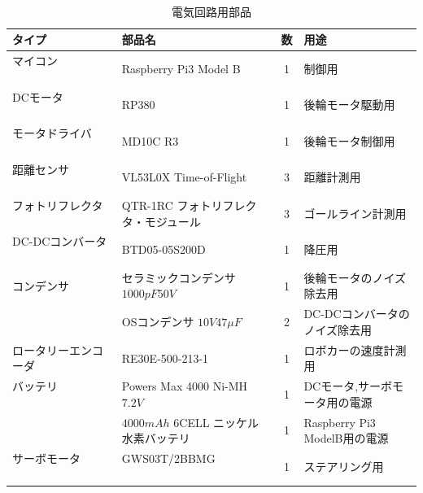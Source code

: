 \begin{table}
　   \caption{電気回路用部品}
　   \label{tab::circuit_parts}
　   \begin{center}
　   \footnotesize
　　　\begin{tabular}{ | l | l | c || l |}\hline
タイプ          　　　　　&部品名              　　　                        &数&用途   \\ \hline\hline
マイコン        　　　　　&Raspberry Pi3 Model B    　                       &1&制御用          　\\ \hline
DCモータ        　　　　　&RP380    　　　　　　　　                    　  &1&後輪モータ駆動用   \\    \hline
モータドライバ        　　&MD10C R3   　　                                   &1&後輪モータ制御用   \\ \hline
距離センサ        　　　　&VL53L0X Time-of-Flight 　                         &3&距離計測用   \\ \hline
フォトリフレクタ        　&QTR-1RC フォトリフレクタ・モジュール              &3&ゴールライン計測用   \\ \hline
DC-DCコンバータ        　 &BTD05-05S200D                                     &1&降圧用   \\ \hline
コンデンサ                &セラミックコンデンサ$1000\unit{pF}50\unit{V}$ &1&後輪モータのノイズ除去用   \\ \cline{2-4}
                          &OSコンデンサ $10\unit{V}47\unit{\mu F}$                          &2&DC-DCコンバータのノイズ除去用    \\ \hline
ロータリーエンコーダ　　　&RE30E-500-213-1                                   &1&ロボカーの速度計測用   \\ \hline
バッテリ        　　　　　&Powers Max 4000 Ni-MH $7.2\unit{V}$                        &1&DCモータ,サーボモータ用の電源\\ \cline{2-4}
                          &$4000\unit{mAh}$ 6CELL ニッケル水素バッテリ                &1&Raspberry Pi3 ModelB用の電源    \\ \hline
サーボモータ        　　　&GWS03T/2BBMG 　　　　　　　　                      　&1&ステアリング用   \\    \hline
 
	   \end{tabular} 
	\end{center}
\end{table}





